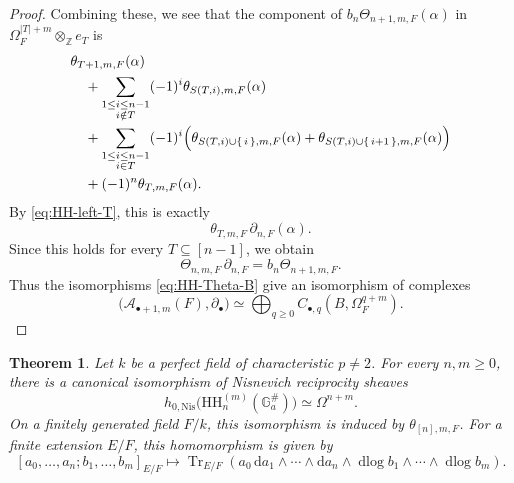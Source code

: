 \documentclass[a4paper,12pt,reqno]{amsart}
\numberwithin{equation}{section}
\newtheorem{thm}{Theorem}[section]
\theoremstyle{definition}
\newcommand{\Z}{\mathbb{Z}}
\DeclareMathOperator{\dlog}{dlog}
\DeclareMathOperator{\Tr}{Tr}
\renewcommand{\d}{\mathrm{d}}
\newcommand{\Acal}{\mathcal{A}}
\newcommand{\GaSharp}{\mathbb{G}_{a}^{\#}}
\newcommand{\Nis}{\mathrm{Nis}}
\begin{document}
\begin{proof}
Combining these, 
we see that the component of
$b_n\Theta_{n+1,m,F}(\alpha)$ in
$\Omega_F^{|T|+m}\otimes_{\Z}e_T$ is
\begin{align*}
&\theta_{T+1,m,F}(\alpha)\\
&\quad+
\sum_{\substack{1\leq i\leq n-1\\i\notin T}}
(-1)^i\theta_{S(T,i),m,F}(\alpha)\\
&\quad+
\sum_{\substack{1\leq i\leq n-1\\i\in T}}
(-1)^i
\Bigl(
\theta_{S(T,i)\cup\set{i},m,F}(\alpha)
+
\theta_{S(T,i)\cup\set{i+1},m,F}(\alpha)
\Bigr)\\
&\quad+
(-1)^n\theta_{T,m,F}(\alpha).
\end{align*}
By \eqref{eq:HH-left-T}, this is exactly
\[
 \theta_{T,m,F}\,\partial_{n,F}(\alpha).
\]
Since this holds for every $T\subseteq[n-1]$, we obtain
\[
 \Theta_{n,m,F}\,\partial_{n,F}
 =
 b_n\Theta_{n+1,m,F}.
\]
Thus the isomorphisms
\eqref{eq:HH-Theta-B} give an isomorphism of complexes
\[
 \bigl(\Acal_{\bullet+1,m}(F),\partial_\bullet\bigr)
 \simeq
 \bigoplus_{q\geq0}
 C_{\bullet,q}(B,\Omega_F^{q+m}).
\]
\end{proof}




\begin{thm}\label{thm:HH}
Let $k$ be a perfect field of characteristic $p\neq 2$. 
For every $n,m\geq0$, there is a canonical isomorphism of Nisnevich
reciprocity sheaves
\begin{equation}\label{eq:HH-main}
 h_{0,\Nis}\bigl(\mathrm{HH}_n^{(m)}(\GaSharp)\bigr)\simeq\Omega^{n+m}.
\end{equation}
On a finitely generated field $F/k$, 
this isomorphism is induced by $\theta_{[n],m,F}$. 
For a finite extension $E/F$, this homomorphism is 
given by 
\begin{equation}\label{eq:HH-HKR-map}
 [a_0,\ldots,a_n;b_1,\ldots,b_m]_{E/F}
 \mapsto
 \Tr_{E/F}(a_0\,\d a_1\wedge\cdots\wedge \d a_n \wedge
 \dlog b_1\wedge\cdots\wedge\dlog b_m).
\end{equation}
\end{thm}
\end{document}
